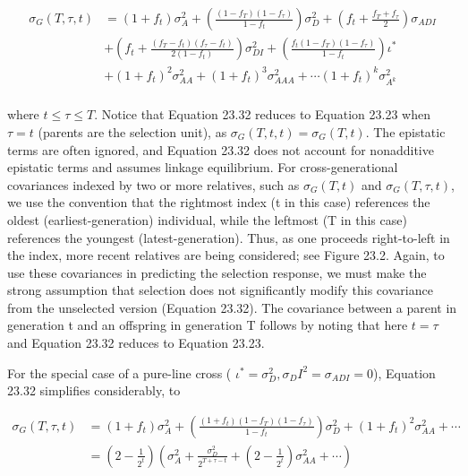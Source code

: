 \documentclass{article}
\begin{document}
\begin{equation}
\begin{aligned}\sigma_{G}(T,\tau,t)&=(1+f_{t})\sigma_{A}^{2}+\left(\frac{(1-f_{T})(1-f_{\tau})}{1-f_{t}}\right)\sigma_{D}^{2}+\left(f_{t}+\frac{f_{T}+f_{\tau}}{2}\right)\sigma_{ADI}\\&+\left(f_{t}+\frac{(f_{T}-f_{t})(f_{\tau}-f_{t})}{2(1-f_{t})}\right)\sigma_{DI}^{2}+\left(\frac{f_{t}(1-f_{T})(1-f_{\tau})}{1-f_{t}}\right)\iota^{*}\\&+(1+f_{t})^{2}\sigma_{AA}^{2}+(1+f_{t})^{3}\sigma_{AAA}^{2}+\cdots(1+f_{t})^{k}\sigma_{A^{k}}^{2}\\ \end{aligned}
\tag{23.32}
\label{eq:23_32}
\end{equation}

where  $ t \leq \tau \leq T $. Notice that Equation 23.32 reduces to Equation 23.23 when  $ \tau = t $ (parents are the selection unit), as  $ \sigma_G(T, t, t) = \sigma_G(T, t) $. The epistatic terms are often ignored, and Equation 23.32 does not account for nonadditive epistatic terms and assumes linkage equilibrium. For cross-generational covariances indexed by two or more relatives, such as  $ \sigma_G(T, t) $ and  $ \sigma_G(T, \tau, t) $, we use the convention that the rightmost index (t in this case) references the oldest (earliest-generation) individual, while the leftmost (T in this case) references the youngest (latest-generation). Thus, as one proceeds right-to-left in the index, more recent relatives are being considered; see Figure 23.2. Again, to use these covariances in predicting the selection response, we must make the strong assumption that selection does not significantly modify this covariance from the unselected version (Equation 23.32). The covariance between a parent in generation t and an offspring in generation T follows by noting that here  $ t = \tau $ and Equation 23.32 reduces to Equation 23.23.

For the special case of a pure-line cross ( $ \iota^* = \sigma_D^2, \sigma_DI^2 = \sigma_{ADI} = 0 $), Equation 23.32 simplifies considerably, to

\begin{equation}
\begin{align*}\sigma_G(T,\tau,t)&=(1+f_t)\sigma_A^2+\left(\frac{(1+f_t)(1-f_T)(1-f_\tau)}{1-f_t}\right)\sigma_D^2+(1+f_t)^2\sigma_{AA}^2+\cdots\\&=\left(2-\frac{1}{2^t}\right)\left(\sigma_A^2+\frac{\sigma_D^2}{2^{T+\tau-t}}+\left(2-\frac{1}{2^t}\right)\sigma_{AA}^2+\cdots\right)\\\end{align*}
\tag{23.33}
\label{eq:23_33}
\end{equation}
\end{document}
